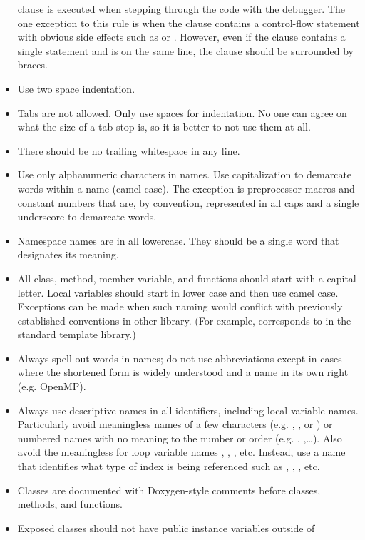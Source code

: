 \begin{itemize}
  clause is executed when stepping through the code with the debugger. The
  one exception to this rule is when the clause contains a control-flow
  statement with obvious side effects such as  or
  . However, even if the clause contains a single statement
  and is on the same line, the clause should be surrounded by braces.
\item Use two space indentation.
\item Tabs are not allowed. Only use spaces for indentation. No one can
  agree on what the size of a tab stop is, so it is better to not use them
  at all.
\item There should be no trailing whitespace in any line.
\item Use only alphanumeric characters in names. Use capitalization to
  demarcate words within a name (camel case). The exception is preprocessor
  macros and constant numbers that are, by convention, represented in all
  caps and a single underscore to demarcate words.
\item Namespace names are in all lowercase. They should be a single word
  that designates its meaning.
\item All class, method, member variable, and functions should start with a
  capital letter. Local variables should start in lower case and then use
  camel case. Exceptions can be made when such naming would conflict with
  previously established conventions in other library. (For example,
   corresponds to  in the
  standard template library.)
\item Always spell out words in names; do not use abbreviations except in
  cases where the shortened form is widely understood and a name in its own
  right (e.g. OpenMP).
\item Always use descriptive names in all identifiers, including local
  variable names. Particularly avoid meaningless names of a few characters
  (e.g. , , or ) or numbered names
  with no meaning to the number or order (e.g. ,
  ,\ldots). Also avoid the meaningless for loop variable
  names , , , etc. Instead, use a name
  that identifies what type of index is being referenced such as
  , , ,
  etc.
\item Classes are documented with Doxygen-style comments before classes,
  methods, and functions.
\item Exposed classes should not have public instance variables outside of

\end{itemize}
